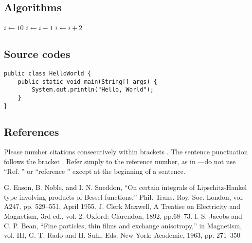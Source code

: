 \documentclass{article}
\begin{document}
\subsection{Algorithms}
\begin{algorithmic}
\STATE $i \gets 10$
\STATE $i\gets i-1$
\ELSE
{}
\STATE $i \gets i+2$
\ENDIF
\ENDIF
\end{algorithmic}

\subsection{Source codes}
\begin{verbatim}
public class HelloWorld {
    public static void main(String[] args) {
        System.out.println("Hello, World");
    }
}
\end{verbatim}

\subsection{References}
Please number citations consecutively within brackets \cite{Eason}. The sentence punctuation follows the bracket \cite{Maxwell}. Refer simply to the reference number, as in \cite{Jacobs}—do
not use “Ref. \cite{Jacobs}” or “reference \cite{Jacobs}” except at the beginning of a sentence.


\begin{thebibliography}{00}
 G. Eason, B. Noble, and I. N. Sneddon, ``On certain integrals of Lipschitz-Hankel type involving products of Bessel functions,'' Phil. Trans. Roy. Soc. London, vol. A247, pp. 529--551, April 1955.
 J. Clerk Maxwell, A Treatise on Electricity and Magnetism, 3rd ed., vol. 2. Oxford: Clarendon, 1892, pp.68--73.
 I. S. Jacobs and C. P. Bean, ``Fine particles, thin films and exchange anisotropy,'' in Magnetism, vol. III, G. T. Rado and H. Suhl, Eds. New York: Academic, 1963, pp. 271--350
\end{thebibliography}
\end{document}
